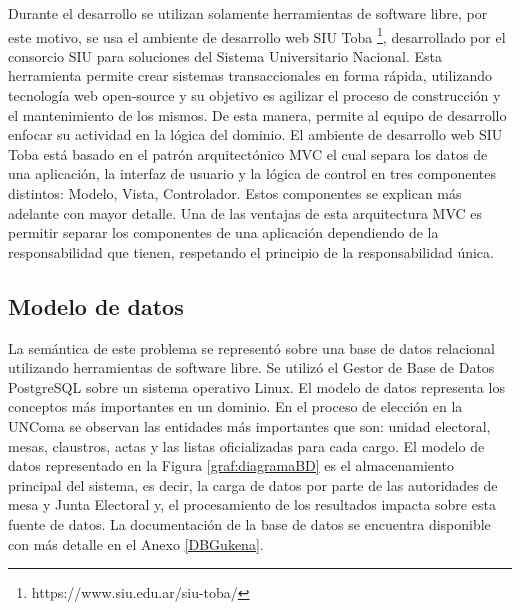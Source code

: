 Durante el desarrollo se utilizan solamente herramientas de software libre, por este motivo, se usa el ambiente de desarrollo web SIU Toba \footnote{https://www.siu.edu.ar/siu-toba/}, desarrollado por el consorcio SIU para soluciones del Sistema Universitario Nacional. Esta herramienta
permite crear sistemas transaccionales en forma rápida, utilizando tecnología web open-source y su objetivo es agilizar el proceso de construcción y el mantenimiento de los mismos. De esta manera, permite al equipo de desarrollo enfocar su actividad en la lógica del dominio. El ambiente de desarrollo web SIU Toba está basado en el patrón arquitectónico MVC el cual separa los datos de una aplicación, la interfaz de usuario y la lógica de control en tres componentes distintos: Modelo, Vista, Controlador. Estos componentes se explican más adelante con mayor detalle. Una de las ventajas de esta arquitectura MVC es permitir separar los componentes de una aplicación dependiendo de la responsabilidad que tienen, respetando el principio de la responsabilidad única.


\subsection{Modelo de datos}

La semántica de este problema se representó sobre una base de datos relacional utilizando herramientas de software libre. Se utilizó el Gestor de Base de Datos PostgreSQL sobre un sistema operativo Linux. El modelo de datos representa los conceptos más importantes en un dominio. En el proceso de elección en la UNComa se observan las entidades más importantes que son: unidad electoral, mesas, claustros, actas y las listas oficializadas para cada cargo.
El modelo de datos representado en la Figura \ref{graf:diagramaBD} es el almacenamiento principal del sistema, es decir, la carga de datos por parte de las autoridades de mesa y Junta Electoral y, el procesamiento de los resultados impacta sobre esta fuente de datos. La documentación de la base de datos se encuentra disponible con más detalle en el Anexo \ref{DBGukena}.

